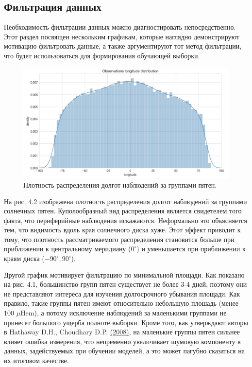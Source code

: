 \documentclass[a4paper, 12pt]{article}
\newcommand{\bibref}[3]{#2 \hyperlink{#1}{\color{blue}(#3)}}
\begin{document}
\subsection{Фильтрация данных}

Необходимость фильтрации данных можно диагностировать непосредственно. Этот раздел посвящен нескольким графикам, которые наглядно демонстрируют мотивацию фильтровать данные, а также аргументируют тот метод фильтрации, что будет использоваться для формирования обучающей выборки. 

\begin{figure}[H]
    \centering
    \includegraphics[width=17cm]{longitude_distr.png}
    \caption{Плотность распределения долгот наблюдений за группами пятен.}
    \label{fig:my_label}
\end{figure}{}

На рис. 4.2 изображена плотность распределения долгот наблюдений за группами солнечных пятен. Куполообразный вид распределения является свидетелем того факта, что периферийные наблюдения искажаются. Неформально это объясняется тем, что видимость вдоль края солнечного диска хуже. Этот эффект приводит к тому, что плотность рассматриваемого распределения становится больше при приближении к центральному меридиану ($0^\circ$) и уменьшается при приближении к краям диска ($-90^\circ, 90^\circ$).

Другой график мотивирует фильтрацию по минимальной площади. Как показано на рис. 4.1, большинство групп пятен существует не более 3-4 дней, поэтому они не представляют интереса для изучения долгосрочного убывания площади. Как правило, такие группы пятен имеют относительно небольшую плошадь (менее 100 $\mu$Hem), а потому исключение наблюдений за маленькими группами не принесет большого ущерба полноте выборки. Кроме того, как утверждают авторы в \bibref{hathaway}{Hathaway D.H., Choudhary D.P.}{2008}, на маленькие группы пятен сильнее влияет ошибка измерения, что непременно увеличивает шумовую компоненту в данных, задействуемых при обучении моделей, а это может пагубно сказаться на их итоговом качестве.
\end{document}
